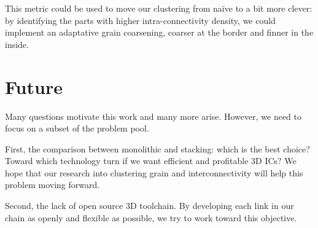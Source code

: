 \documentclass[11pt,a4paper]{report} %
\theoremstyle{customdef}
\begin{document}
This metric could be used to move our clustering from naïve to a bit more clever: by identifying the parts with higher intra-connectivity density, we could implement an adaptative grain coarsening, coarser at the border and finner in the inside.




\chapter{Future}\label{chap:future}
Many questions motivate this work and many more arise.
However, we need to focus on a subset of the problem pool.

First, the comparison between monolithic and stacking: which is the best choice?
Toward which technology turn if we want efficient and profitable 3D ICs?
We hope that our research into clustering grain and interconnectivity will help this problem moving forward.

Second, the lack of open source 3D toolchain.
By developing each link in our chain as openly and flexible as possible, we try to work toward this objective.
\end{document}
